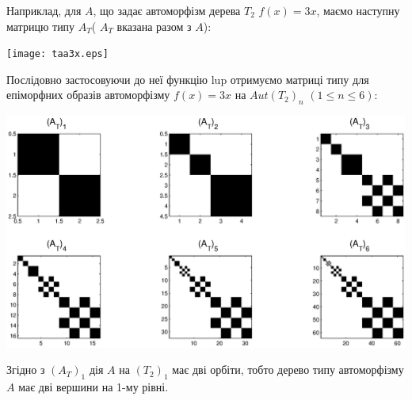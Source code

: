 \documentclass[a4paper,12pt]{article} \usepackage{a4wide}
\numberwithin{equation}{subsection}
\begin{document}
Наприклад, для $A$, що задає автоморфізм дерева $T_2$ $f(x)=3x$, маємо наступну матрицю типу $A_T$( $A_T$ вказана разом з $A$):
\begin{center}
\texttt{[image: taa3x.eps]}
\end{center}

Послідовно застосовуючи до неї функцію lup отримуємо матриці типу для епіморфних образів автоморфізму $f(x)=3x$ на $Aut(T_2)_n$ $(1\leq n\leq 6)$:
\begin{center}
\includegraphics[scale=0.5]{evmatypetr3x.eps}
\end{center}
Згідно з $(A_T)_1$ дія $A$ на $(T_2)_1$ має дві орбіти, тобто дерево типу автоморфізму $A$ має дві вершини на 1-му рівні.
\end{document}
